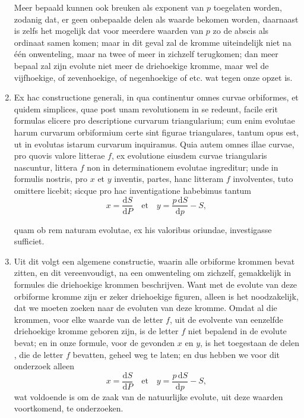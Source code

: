 \documentclass[10pt,a4paper]{article}
\newcommand{\switchenum}{\setcounter{enumi}{\arabic{enumi}-1}\switchcolumn}
\def\D{\mathrm{d}}
\begin{document}
\begin{paracol}{2}
\begin{enumerate}[topsep=1px]
		Meer bepaald kunnen ook breuken als exponent van $p$ toegelaten worden, zodanig dat, er geen onbepaalde delen als waarde bekomen worden, daarnaast is zelfs het mogelijk dat voor meerdere waarden van $p$ zo de abscis als ordinaat samen komen; maar in dit geval zal de kromme uiteindelijk niet na één onwenteling, maar na twee of meer in zichzelf terugkomen;  dan meer bepaal zal zijn evolute niet meer de driehoekige kromme, maar wel de vijfhoekige, of zevenhoekige, of negenhoekige of etc. wat tegen onze opzet is.
		

		\switchcolumn*
		
		\item Ex hac constructione generali, in qua continentur omnes curvae orbiformes, et quidem simplices, quae post unam revolutionem in se redeunt, facile erit formulas elicere pro descriptione curvarum triangularium; cum enim evolutae harum curvarum orbiformium certe sint figurae triangulares, tantum opus est, ut in evolutas istarum curvarum inquiramus. Quia autem omnes illae curvae, pro quovis valore litterae $f$, ex evolutione eiusdem curvae triangularis nascuntur, littera $f$ non in determinationem evolutae ingreditur; unde in formulis nostris, pro $x$ et $y$ inventis, partes, hanc litteram $f$ involventes, tuto omittere licebit; sicque pro hac inventigatione habebimus tantum
		\[
			x = \frac{\D S}{\D P} \quad\text{et} \quad y = \frac{p\,\D S}{\D p}-S,
		\]
		\par quam ob rem naturam evolutae, ex his valoribus oriundae, investigasse sufficiet. 
		
		\switchenum
		\item Uit dit volgt een algemene constructie, waarin alle orbiforme krommen bevat zitten, en dit vereenvoudigt, na een omwenteling om zichzelf, gemakkelijk in formules die driehoekige krommen beschrijven. Want met de evolute van deze orbiforme kromme zijn er zeker driehoekige figuren, alleen is het noodzakelijk, dat we moeten zoeken naar de evoluten van deze kromme. Omdat al die krommen, voor elke waarde van de letter $f$, uit de evolvente van eenzelfde driehoekige kromme geboren zijn, is de letter $f$ niet bepalend in de evolute bevat; en in onze formule, voor de gevonden $x$ en $y$, is het toegestaan de delen , die de letter $f$ bevatten, geheel weg te laten; en dus hebben we voor dit onderzoek alleen
		\[
			x = \frac{\D S}{\D P} \quad\text{et} \quad y = \frac{p\,\D S}{\D p}-S,
		\]
		wat voldoende is om de zaak van de natuurlijke evolute, uit deze waarden voortkomend, te onderzoeken.
		

\end{enumerate}
\end{paracol}
\end{document}
